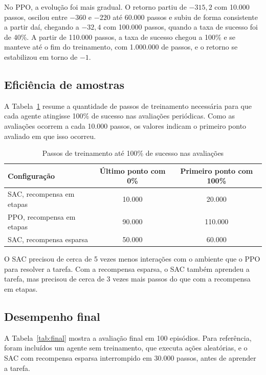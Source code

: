 No PPO, a evolução foi mais gradual. O retorno partiu de $-315{,}2$ com 10.000 passos, oscilou entre $-360$ e $-220$ até 60.000 passos e subiu de forma consistente a partir daí, chegando a $-32{,}4$ com 100.000 passos, quando a taxa de sucesso foi de 40\%. A partir de 110.000 passos, a taxa de sucesso chegou a 100\% e se manteve até o fim do treinamento, com 1.000.000 de passos, e o retorno se estabilizou em torno de $-1$.

\subsection{Eficiência de amostras}

A Tabela~\ref{tab:eficiencia} resume a quantidade de passos de treinamento necessária para que cada agente atingisse 100\% de sucesso nas avaliações periódicas. Como as avaliações ocorrem a cada 10.000 passos, os valores indicam o primeiro ponto avaliado em que isso ocorreu.

\begin{table}[htb]
    \centering
    \caption{Passos de treinamento até 100\% de sucesso nas avaliações}
    \label{tab:eficiencia}
    \begin{tabular}{lcc}
        \hline
        Configuração & Último ponto com 0\% & Primeiro ponto com 100\% \\
        \hline
        SAC, recompensa em etapas    & 10.000 & 20.000 \\
        PPO, recompensa em etapas    & 90.000 & 110.000 \\
        SAC, recompensa esparsa      & 50.000 & 60.000 \\
        \hline
    \end{tabular}
\end{table}

O SAC precisou de cerca de 5 vezes menos interações com o ambiente que o PPO para resolver a tarefa. Com a recompensa esparsa, o SAC também aprendeu a tarefa, mas precisou de cerca de 3 vezes mais passos do que com a recompensa em etapas.

\subsection{Desempenho final}

A Tabela~\ref{tab:final} mostra a avaliação final em 100 episódios. Para referência, foram incluídos um agente sem treinamento, que executa ações aleatórias, e o SAC com recompensa esparsa interrompido em 30.000 passos, antes de aprender a tarefa.

